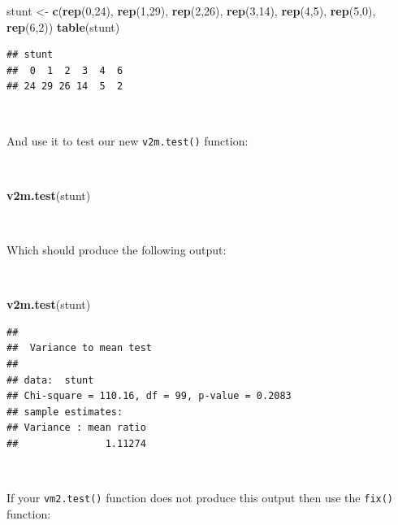 \documentclass[12pt,a4paper]{book}
\newenvironment{Shaded}{\begin{snugshade}}{\end{snugshade}}
\newcommand{\DecValTok}[1]{\textcolor[rgb]{0.00,0.00,0.81}{#1}}
\newcommand{\KeywordTok}[1]{\textcolor[rgb]{0.13,0.29,0.53}{\textbf{#1}}}
\newcommand{\NormalTok}[1]{#1}
\newcommand{\StringTok}[1]{\textcolor[rgb]{0.31,0.60,0.02}{#1}}
\theoremstyle{definition}
\theoremstyle{definition}
\theoremstyle{definition}
\theoremstyle{remark}
\begin{document}
\begin{Shaded}
\begin{Highlighting}[]
\NormalTok{stunt <-}\StringTok{ }\KeywordTok{c}\NormalTok{(}\KeywordTok{rep}\NormalTok{(}\DecValTok{0}\NormalTok{,}\DecValTok{24}\NormalTok{), }\KeywordTok{rep}\NormalTok{(}\DecValTok{1}\NormalTok{,}\DecValTok{29}\NormalTok{), }\KeywordTok{rep}\NormalTok{(}\DecValTok{2}\NormalTok{,}\DecValTok{26}\NormalTok{), }\KeywordTok{rep}\NormalTok{(}\DecValTok{3}\NormalTok{,}\DecValTok{14}\NormalTok{), }\KeywordTok{rep}\NormalTok{(}\DecValTok{4}\NormalTok{,}\DecValTok{5}\NormalTok{),}
           \KeywordTok{rep}\NormalTok{(}\DecValTok{5}\NormalTok{,}\DecValTok{0}\NormalTok{), }\KeywordTok{rep}\NormalTok{(}\DecValTok{6}\NormalTok{,}\DecValTok{2}\NormalTok{))}
\KeywordTok{table}\NormalTok{(stunt)}
\end{Highlighting}
\end{Shaded}

\begin{verbatim}
## stunt
##  0  1  2  3  4  6 
## 24 29 26 14  5  2
\end{verbatim}

~

And use it to test our new \texttt{v2m.test()} function:

~

\begin{Shaded}
\begin{Highlighting}[]
\KeywordTok{v2m.test}\NormalTok{(stunt)}
\end{Highlighting}
\end{Shaded}

~

Which should produce the following output:

~

\begin{Shaded}
\begin{Highlighting}[]
\KeywordTok{v2m.test}\NormalTok{(stunt)}
\end{Highlighting}
\end{Shaded}

\begin{verbatim}
## 
##  Variance to mean test
## 
## data:  stunt
## Chi-square = 110.16, df = 99, p-value = 0.2083
## sample estimates:
## Variance : mean ratio 
##               1.11274
\end{verbatim}

~

If your \texttt{vm2.test()} function does not produce this output then
use the \texttt{fix()} function:
\end{document}
